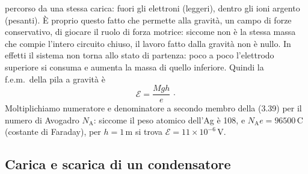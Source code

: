 percorso da una stessa carica: fuori gli elettroni (leggeri), dentro gli ioni
argento (pesanti). \`E proprio questo fatto che permette alla gravit\`a, un
campo di forze conservativo, di giocare il ruolo di forza motrice: siccome non
\`e la stessa massa che compie l'intero circuito chiuso, il lavoro fatto dalla
gravit\`a non \`e nullo. In effetti il sistema non torna allo stato di partenza:
poco a poco l'elettrodo superiore si consuma e aumenta la massa di quello
inferiore.
Quindi la f.e.m.\ della pila a gravit\`a \`e
\begin{equation}
  \mathcal E=\frac{Mgh}{e}\,\cdot
  \tag{3.39}
\end{equation}
Moltiplichiamo numeratore e denominatore a secondo membro della (3.39) per il
numero di Avogadro $N_\mathrm A$: siccome il peso atomico dell'Ag \`e 108, e
$N_\mathrm Ae=96500$\,C (costante di Faraday), per $h=1$\,m si trova
$\mathcal E=11\times10^{-6}$\,V.

\subsection{Carica e scarica di un condensatore}

